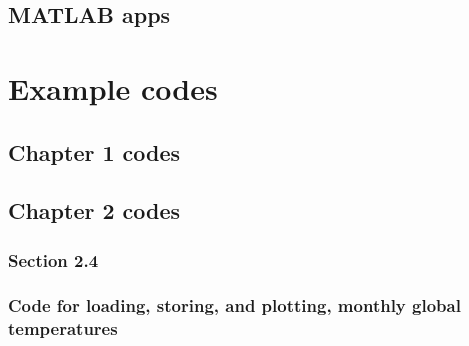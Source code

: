\documentclass{tufte-book} %
\begin{document}

\section{\textbf{MATLAB} apps}




\chapter{Example codes}
\label{ch:11}


\newpage


\section{Chapter 1 codes}


\newpage


\section{Chapter 2 codes}


\subsection*{\textbf{Section 2.4}}

\subsection*{Code for loading, storing, and plotting, monthly global temperatures}
\end{document}
